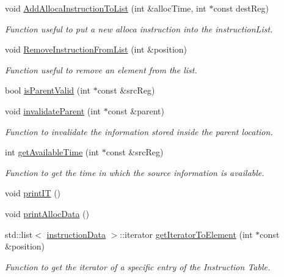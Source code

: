 \begin{DoxyCompactItemize}
void \hyperlink{classoctantis_1_1InstructionTable_a8209ad0dedb13565de1712d3636fec0e}{Add\+Alloca\+Instruction\+To\+List} (int \&alloc\+Time, int $\ast$const dest\+Reg)
\begin{DoxyCompactList}\small\item\em Function useful to put a new alloca instruction into the instruction\+List. \end{DoxyCompactList}\item 
void \hyperlink{classoctantis_1_1InstructionTable_a30b7f55d07699df52d48822ea4f886b4}{Remove\+Instruction\+From\+List} (int \&position)
\begin{DoxyCompactList}\small\item\em Function useful to remove an element from the list. \end{DoxyCompactList}\item 
bool \hyperlink{classoctantis_1_1InstructionTable_aa23ec2def1ff2cd76a79a252944c9b27}{is\+Parent\+Valid} (int $\ast$const \&src\+Reg)
\item 
void \hyperlink{classoctantis_1_1InstructionTable_add6088740c6b85cc51145cc452382339}{invalidate\+Parent} (int $\ast$const \&parent)
\begin{DoxyCompactList}\small\item\em Function to invalidate the information stored inside the parent location. \end{DoxyCompactList}\item 
int \hyperlink{classoctantis_1_1InstructionTable_a1c2294b6a66fb8811b09380678f8881c}{get\+Available\+Time} (int $\ast$const \&src\+Reg)
\begin{DoxyCompactList}\small\item\em Function to get the time in which the source information is available. \end{DoxyCompactList}\item 
void \hyperlink{classoctantis_1_1InstructionTable_a949d0ad63e3f990f845fdb632b4c97fa}{print\+IT} ()
\item 
void \hyperlink{classoctantis_1_1InstructionTable_a0ed0b3774f3551c6a1161394a33ea8d3}{print\+Alloc\+Data} ()
\item 
std\+::list$<$ \hyperlink{structoctantis_1_1InstructionTable_1_1instructionData}{instruction\+Data} $>$\+::iterator \hyperlink{classoctantis_1_1InstructionTable_a6894d7162a4f2aeb64de48a6c7f0e8ca}{get\+Iterator\+To\+Element} (int $\ast$const \&position)
\begin{DoxyCompactList}\small\item\em Function to get the iterator of a specific entry of the Instruction Table. \end{DoxyCompactList}\end{DoxyCompactItemize}
